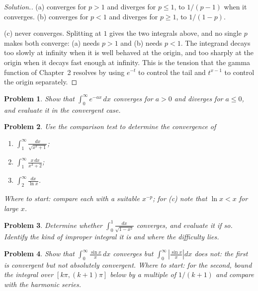 \documentclass[12pt,a4paper]{report}
\theoremstyle{definition}
\theoremstyle{plain}
\newtheorem{problemx}{Problem}[section]
\newenvironment{problem}{\begin{problemx}}{\end{problemx}}
\newenvironment{solution}
  {\renewcommand{\qedsymbol}{}\begin{proof}[\textit{Solution}.]}
  {\end{proof}}
\begin{document}
\begin{solution}
(a) converges for $p>1$ and diverges for $p\leq1$, to $1/(p-1)$ when it
converges. (b) converges for $p<1$ and diverges for $p\geq1$, to $1/(1-p)$.

(c) never converges. Splitting at $1$ gives the two integrals above, and no
single $p$ makes both converge: (a) needs $p>1$ and (b) needs $p<1$. The
integrand decays too slowly at infinity when it is well behaved at the origin,
and too sharply at the origin when it decays fast enough at infinity. This is
the tension that the gamma function of Chapter~2 resolves by using $e^{-t}$ to
control the tail and $t^{x-1}$ to control the origin separately.
\end{solution}

\begin{problem}
Show that $\displaystyle\int^{\infty}_{0}e^{-ax}\,dx$ converges for $a>0$ and
diverges for $a\leq0$, and evaluate it in the convergent case.
\end{problem}

\begin{problem}
Use the comparison test to determine the convergence of
\begin{enumerate}
\item[(a)] $\displaystyle\int^{\infty}_{1}\frac{dx}{\sqrt{x^{3}+1}}$;
\item[(b)] $\displaystyle\int^{\infty}_{1}\frac{x\,dx}{x^{3}+2}$;
\item[(c)] $\displaystyle\int^{\infty}_{2}\frac{dx}{\ln x}$.
\end{enumerate}
\emph{Where to start: compare each with a suitable $x^{-p}$; for (c) note that
$\ln x < x$ for large $x$.}
\end{problem}

\begin{problem}
Determine whether $\displaystyle\int^{1}_{0}\frac{dx}{\sqrt{1-x^{2}}}$
converges, and evaluate it if so. Identify the kind of improper integral it is
and where the difficulty lies.
\end{problem}

\begin{problem}
Show that $\displaystyle\int^{\infty}_{0}\frac{\sin x}{x}\,dx$ converges but
$\displaystyle\int^{\infty}_{0}\left|\frac{\sin x}{x}\right|dx$ does not: the
first is convergent but not absolutely convergent.
\emph{Where to start: for the second, bound the integral over
$[k\pi,(k+1)\pi]$ below by a multiple of $1/(k+1)$ and compare with the
harmonic series.}
\end{problem}
\end{document}
